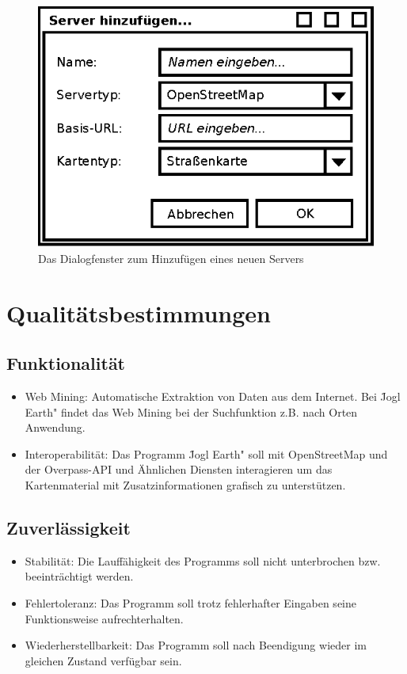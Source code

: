 \documentclass[10pt]{scrreprt}
\begin{document}
\begin{figure}
	\centering
	\includegraphics[scale=0.9]{GUI-ServerDialog.eps}
	\caption{Das Dialogfenster zum Hinzufügen eines neuen Servers}
\end{figure}




\chapter{Qualitätsbestimmungen}

\section{Funktionalität}
\begin{itemize}
\item Web Mining: Automatische Extraktion von Daten aus dem Internet. Bei \"Jogl Earth" findet das Web Mining bei der Suchfunktion z.B. nach Orten Anwendung.
\item Interoperabilität: Das Programm \"Jogl Earth" soll mit OpenStreetMap und der Overpass-API und Ähnlichen Diensten interagieren um das Kartenmaterial mit Zusatzinformationen grafisch zu unterstützen.
\end{itemize}


\section{Zuverlässigkeit}
\begin{itemize}
\item Stabilität: Die Lauffähigkeit des Programms soll nicht unterbrochen bzw. beeinträchtigt werden.
\item Fehlertoleranz: Das Programm soll trotz fehlerhafter Eingaben seine Funktionsweise aufrechterhalten.
\item Wiederherstellbarkeit: Das Programm soll nach Beendigung wieder im gleichen Zustand verfügbar sein.
\end{itemize}
\end{document}
